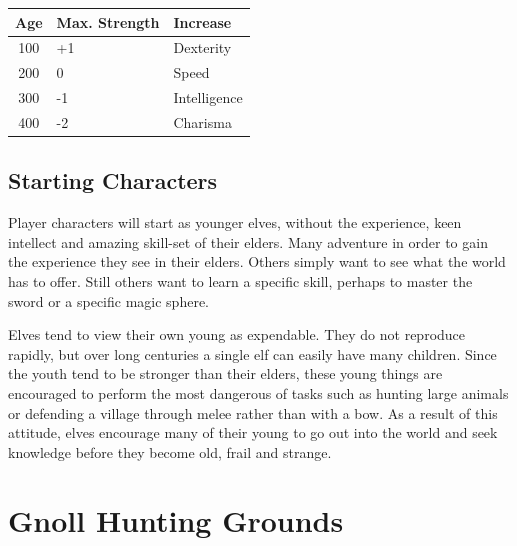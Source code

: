 \documentclass[titlepage,a4paper,openany]{book}
\begin{document}
\begin{multicols}{2}
	\begin{tabular}{cll}

		Age & Max. Strength & Increase \\\hline

		100 & +1 & Dexterity \\

		200 & 0 & Speed \\

		300 & -1 & Intelligence \\

		400 & -2 & Charisma \\

	\end{tabular}

\subsection{Starting Characters}

Player characters will start as younger elves, without the experience, keen intellect and amazing skill-set of their elders. Many adventure in order to gain the experience they see in their elders. Others simply want to see what the world has to offer. Still others want to learn a specific skill, perhaps to master the sword or a specific magic sphere.

Elves tend to view their own young as expendable. They do not reproduce rapidly, but over long centuries a single elf can easily have many children. Since the youth tend to be stronger than their elders, these young things are encouraged to perform the most dangerous of tasks such as hunting large animals or defending a village through melee rather than with a bow. As a result of this attitude, elves encourage many of their young to go out into the world and seek knowledge before they become old, frail and strange.

\end{multicols}

\section[Gnolls]{Gnoll Hunting Grounds}
\end{document}
